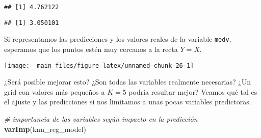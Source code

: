 \documentclass[]{book}
\newenvironment{Shaded}{\begin{snugshade}}{\end{snugshade}}
\newcommand{\CommentTok}[1]{\textcolor[rgb]{0.56,0.35,0.01}{\textit{#1}}}
\newcommand{\DataTypeTok}[1]{\textcolor[rgb]{0.13,0.29,0.53}{#1}}
\newcommand{\DecValTok}[1]{\textcolor[rgb]{0.00,0.00,0.81}{#1}}
\newcommand{\KeywordTok}[1]{\textcolor[rgb]{0.13,0.29,0.53}{\textbf{#1}}}
\newcommand{\NormalTok}[1]{#1}
\newcommand{\OperatorTok}[1]{\textcolor[rgb]{0.81,0.36,0.00}{\textbf{#1}}}
\newcommand{\StringTok}[1]{\textcolor[rgb]{0.31,0.60,0.02}{#1}}
\begin{document}
\begin{verbatim}
## [1] 4.762122
\end{verbatim}

\begin{Shaded}
\end{Shaded}

\begin{verbatim}
## [1] 3.050101
\end{verbatim}

Si representamos las predicciones y los valores reales de la variable \texttt{medv}, esperamos que los puntos estén muy cercanos a la recta \(Y = X\).

\begin{Shaded}
\end{Shaded}

\begin{center}\texttt{[image: \_main\_files/figure-latex/unnamed-chunk-26-1]} \end{center}

¿Será posible mejorar esto? ¿Son todas las variables realmente necesarias? ¿Un grid con valores más pequeños a \(K = 5\) podría resultar mejor? Veamos qué tal es el ajuste y las predicciones si nos limitamos a unas pocas variables predictoras.

\begin{Shaded}
\begin{Highlighting}[]
\CommentTok{# importancia de las variables según impacto en la predicción}
\KeywordTok{varImp}\NormalTok{(knn_reg_model)}
\end{Highlighting}
\end{Shaded}
\end{document}

